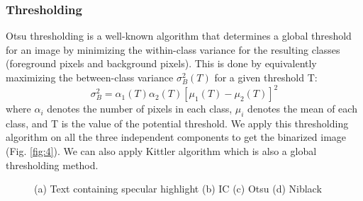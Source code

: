 \subsubsection{Thresholding}

Otsu thresholding \cite{A2} is a well-known algorithm that
determines a global threshold for an image by minimizing 
the within-class variance for the resulting classes (foreground pixels 
and background pixels). This is
done by equivalently maximizing the between-class variance
$\sigma _{B}^{2}(T)$ for a given threshold T:
\begin{equation}
\sigma_{B}^{2}=\alpha_1(T)\alpha_2(T)[\mu_1(T)-\mu_2(T)]^2 
\end{equation}
where $\alpha_i$ denotes the number of pixels in each class, $\mu_i$ denotes 
the mean of each class, and T is the value of the potential threshold. 
We apply this thresholding algorithm on all the three independent components to get the binarized image (Fig. \ref{fig:4}).
We can also apply Kittler \cite{A5} algorithm which is also a global thresholding method.
\begin{figure}[tp]
\centering
{}
\caption
{(a) Text containing specular highlight (b) IC (c) Otsu (d) Niblack}
\label{fig:5}
\end{figure}

